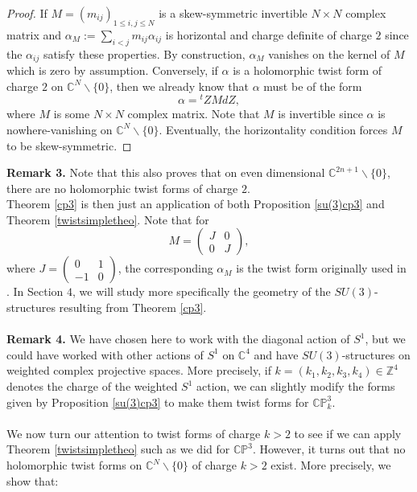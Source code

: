 \documentclass[12pt, reqno]{amsart}
\newcommand{\C}{\mathbb{C}}
\newcommand{\p}{\mathbb{P}}
\newcommand{\Z}{\mathbb{Z}}
\begin{document}
    \begin{proof}
        If $M=(m_{ij})_{1\leq i,j\leq N}$ is a skew-symmetric invertible $N\times N$ complex matrix and $\alpha_M:=\sum_{i<j}m_{ij}\alpha_{ij}$ is horizontal and charge definite of charge $2$ since the $\alpha_{ij}$ satisfy these properties. By construction, $\alpha_M$ vanishes on the kernel of $M$ which is zero by assumption. Conversely, if $\alpha$ is a holomorphic twist form of charge $2$ on $\C^N\backslash\{0\}$, then we already know that $\alpha$ must be of the form \[\alpha={}^tZMdZ,\] where $M$ is some $N\times N$ complex matrix. Note that $M$ is invertible since $\alpha$ is nowhere-vanishing on $\C^N\backslash\{0\}$. Eventually, the horizontality condition forces $M$ to be skew-symmetric. 
    \end{proof}
\noindent\textbf{Remark 3.}
        Note that this also proves that on even dimensional $\C^{2n+1}\backslash\{0\}$, there are no holomorphic twist forms of charge $2$. \\ 
    \indent Theorem \ref{cp3} is then just an application of both Proposition \ref{su(3)cp3} and Theorem \ref{twistsimpletheo}. Note that for \[M=\begin{pmatrix}
        J&0\\0&J
    \end{pmatrix},\] where $J=\begin{pmatrix}
        0&1\\-1&0
    \end{pmatrix}$, the corresponding $\alpha_M$ is the twist form originally used in \cite{Larfors_2013,Larfors_2010}. In Section $4$, we will study more specifically the geometry of the $SU(3)$-structures resulting from Theorem \ref{cp3}.\\ \\
    \noindent  \textbf{Remark 4.} We have chosen here to work with the diagonal action of $S^1$, but we could have worked with other actions of $S^1$ on $\C^4$ and have $SU(3)$-structures on weighted complex projective spaces. More precisely, if $k=(k_1,k_2,k_3,k_4)\in\Z^4$ denotes the charge of the weighted $S^1$ action, we can slightly modify the forms given by Proposition \ref{su(3)cp3} to make them twist forms for $\C\p^3_k$.
   \\\\ \indent We now turn our attention to twist forms of charge $k>2$ to see if we can apply Theorem \ref{twistsimpletheo} such as we did for $\C\p^3$. However, it turns out that no holomorphic twist forms on $\C^N\backslash\{0\}$ of charge $k>2$ exist. More precisely, we show that: 
\end{document}
